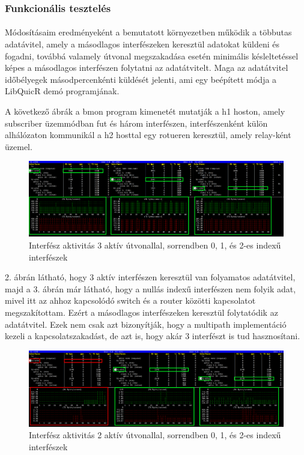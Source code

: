 \documentclass[a4paper,oneside]{article}
\begin{document}
\subsubsection{Funkcionális tesztelés}
\paragraph{}

Módosításaim eredményeként a bemutatott környezetben működik a többutas adatávitel, 
amely a másodlagos interfészeken keresztül adatokat küldeni és fogadni, továbbá valamely útvonal megszakadása esetén
minimális késleltetéssel képes a másodlagos interfészen folytatni az adatátvitelt.
Maga az adatátvitel időbélyegek másodpercenkénti küldését jelenti, ami egy beépített módja a LibQuicR demó programjának.

A következő ábrák a bmon program kimenetét mutatják a h1 hoston, amely subscriber üzemmódban fut és három interfészen, interfészenként
külön alhálózaton kommunikál a h2 hosttal egy rotueren keresztül, amely relay-ként üzemel.

\begin{figure}[h]
  \centering
    \hspace*{-1.5cm}%
    \includegraphics[width=18cm]{bmon11}
\caption{Interfész aktivitás 3 aktív útvonallal, sorrendben 0, 1, és 2-es indexű interfészek}
\end{figure}

2. ábrán látható, hogy 3 aktív interfészen keresztül van folyamatos adatátvitel, majd a 3. ábrán 
már látható, hogy a nullás indexű interfészen nem folyik adat, mivel itt az ahhoz kapcsolódó switch és a router közötti kapcsolatot megszakítottam.
Ezért a másodlagos interfészeken keresztül folytatódik az adatátvitel. Ezek nem csak azt bizonyítják, hogy a multipath 
implementáció kezeli a kapcsolatszakadást, de azt is, hogy akár 3 interfészt is tud hasznosítani.


\begin{figure}[h]
  \centering
    \hspace*{-1.5cm}%
    \includegraphics[width=18cm]{bmon22}
\caption{Interfész aktivitás 2 aktív útvonallal, sorrendben 0, 1, és 2-es indexű interfészek}
\end{figure}
\end{document}
